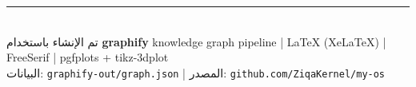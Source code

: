 \documentclass[12pt,a4paper]{article}
\theoremstyle{definition}
\newcommand{\codeinline}[1]{\texttt{\small #1}}
\newcommand{\en}[1]{\textenglish{#1}}
\begin{document}
\vspace{0.8cm}
\begin{center}
\rule{0.5\textwidth}{0.4pt}\\[6pt]
{\small\color{darkgray}
تم الإنشاء باستخدام
\textbf{graphify} knowledge graph pipeline \;|\;
\LaTeX{} (XeLaTeX) \;|\;
FreeSerif \;|\;
pgfplots + tikz-3dplot
}\\[4pt]
{\small\color{darkgray}
البيانات: \codeinline{\en{graphify}-out/graph.json} \;|\;
المصدر: \codeinline{github.com/\en{ZiqaKernel}/my-os}
}
\end{center}
\end{document}
